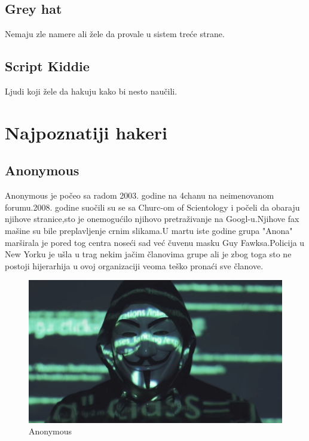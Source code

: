 \documentclass[a4paper]{article}
\begin{document}
\subsection{Grey hat}
Nemaju zle namere ali žele da provale u sistem treće strane.
\subsection{Script Kiddie}
Ljudi koji žele da hakuju kako bi nesto naučili.
\newpage



\section{Najpoznatiji hakeri}
\label{hakeri}

\subsection{Anonymous}
Anonymous je počeo sa radom 2003. godine na 4chanu na neimenovanom forumu.2008. godine suočili su se sa Churc-om of Scientology i počeli da obaraju njihove stranice,sto je onemogućilo njihovo pretraživanje na Googl-u.Njihove fax mašine su bile preplavljenje crnim slikama.U martu iste godine grupa "Anona" marširala je pored tog centra noseći sad već čuvenu masku  Guy Fawksa.Policija u New Yorku je ušla u trag nekim jačim članovima grupe ali je zbog toga sto ne postoji hijerarhija u ovoj organizaciji veoma teško pronaći sve članove.





\begin{figure}[h!]
\begin{center}
\includegraphics[scale=0.10]{anonymous.jpg}
\end{center}
\caption{Anonymous}
\label{fig:anonymous}
\end{figure}
\end{document}
